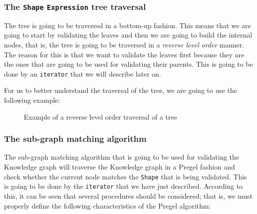 \subsubsection{The \texttt{Shape} \texttt{Expression} tree traversal}

The tree is going to be traversed in a bottom-up fashion. This means that we are going to start by validating the leaves and then we are going to build the internal nodes, that is, the tree is going to be traversed in a \textit{reverse level order} manner. The reason for this is that we want to validate the leaves first because they are the ones that are going to be used for validating their parents. This is going to be done by an \texttt{iterator} that we will describe later on.

For us to better understand the traversal of the tree, we are going to use the following example:

\begin{example}
    \begin{figure}
        \centering
        
        \caption{Example of a reverse level order traversal of a tree}
        \label{fig:tree_traversal}
    \end{figure}
\end{example}

\subsubsection{The sub-graph matching algorithm}

The sub-graph matching algorithm that is going to be used for validating the Knowledge graph will traverse the Knowledge graph in a Pregel fashion and check whether the current node matches the \texttt{Shape} that is being validated. This is going to be done by the \texttt{iterator} that we have just described. According to this, it can be seen that several procedures should be considered; that is, we must properly define the following characteristics of the Pregel algorithm:

